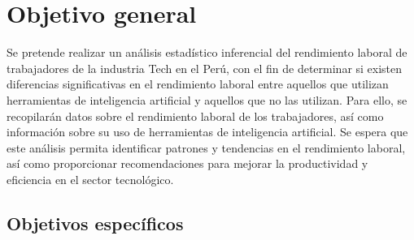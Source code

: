 \section{Objetivo general}

  Se pretende realizar un análisis estadístico inferencial del rendimiento laboral de trabajadores de la industria Tech en el Perú, con el fin de determinar si existen diferencias significativas en el rendimiento laboral entre aquellos que utilizan herramientas de inteligencia artificial y aquellos que no las utilizan. Para ello, se recopilarán datos sobre el rendimiento laboral de los trabajadores, así como información sobre su uso de herramientas de inteligencia artificial. Se espera que este análisis permita identificar patrones y tendencias en el rendimiento laboral, así como proporcionar recomendaciones para mejorar la productividad y eficiencia en el sector tecnológico.
  
  
  \subsection{Objetivos específicos}
  

